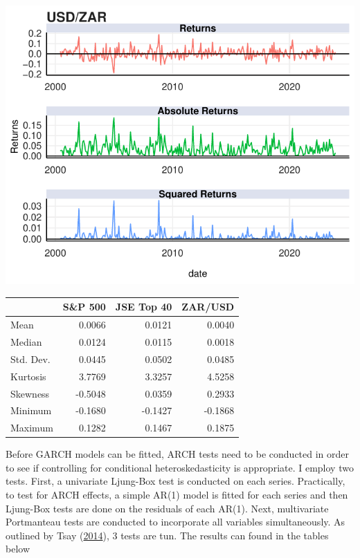 \documentclass[11pt,preprint, authoryear]{elsarticle}
\let\origfigure\figure
\let\endorigfigure\endfigure
\renewenvironment{figure}[1][2] {
    \expandafter\origfigure\expandafter[H]
} {
    \endorigfigure
}
\let\origtable\table
\let\endorigtable\endtable
\renewenvironment{table}[1][2] {
    \expandafter\origtable\expandafter[H]
} {
    \endorigtable
}
\numberwithin{equation}{section}
\numberwithin{figure}{section}
\numberwithin{table}{section}
\begin{document}
\begin{figure}[H]

{\centering \includegraphics{FormalWriteUp_files/figure-latex/Figure3-1} 

}

\caption{ZAR/USD Returns \label{Figure3}}\label{fig:Figure3}
\end{figure}

\begin{table}[H]
\centering
\caption{Summary Statistics \label{tab1}} 
\begin{tabular}{lrrr}
  \hline
 & S\&P 500 & JSE Top 40 & ZAR/USD \\ 
  \hline
Mean & 0.0066 & 0.0121 & 0.0040 \\ 
  Median & 0.0124 & 0.0115 & 0.0018 \\ 
  Std. Dev. & 0.0445 & 0.0502 & 0.0485 \\ 
  Kurtosis & 3.7769 & 3.3257 & 4.5258 \\ 
  Skewness & -0.5048 & 0.0359 & 0.2933 \\ 
  Minimum & -0.1680 & -0.1427 & -0.1868 \\ 
  Maximum & 0.1282 & 0.1467 & 0.1875 \\ 
   \hline
\end{tabular}
\end{table}

Before GARCH models can be fitted, ARCH tests need to be conducted in
order to see if controlling for conditional heteroskedasticity is
appropriate. I employ two tests. First, a univariate Ljung-Box test is
conducted on each series. Practically, to test for ARCH effects, a
simple AR(1) model is fitted for each series and then Ljung-Box tests
are done on the residuals of each AR(1). Next, multivariate Portmanteau
tests are conducted to incorporate all variables simultaneously. As
outlined by Tsay (\protect\hyperlink{ref-Tsay2014}{2014}), 3 tests are
tun. The results can found in the tables below
\end{document}
